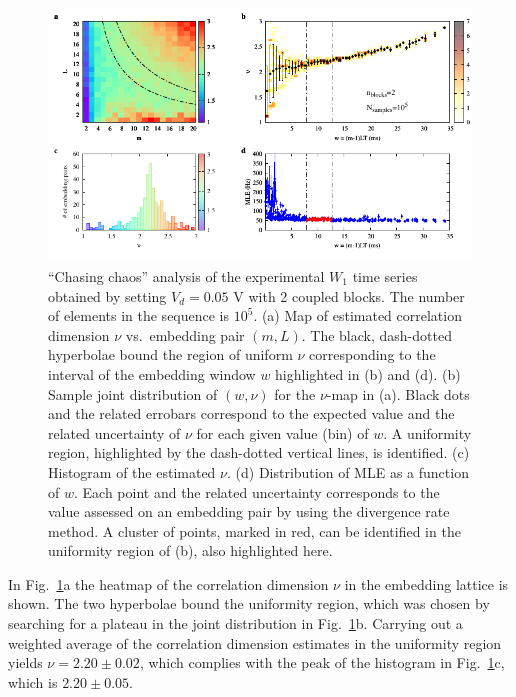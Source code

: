 \begin{figure}[ht!]
    \centering
    \includegraphics[width=\linewidth]{../blocks/2_blocks/1e5_points/plots/chaos.pdf}
    \caption{``Chasing chaos'' analysis of the experimental $W_1$ time series
    obtained by setting $V_d=0.05$ V with 2 coupled blocks.
    The number of elements in the sequence is $10^5$.
    (a) Map of estimated correlation dimension $\nu$ vs.\ embedding pair $(m, L)$.
    The black, dash-dotted hyperbolae bound the region of uniform $\nu$ corresponding to the interval of the
    embedding window $w$ highlighted in (b) and (d).
    (b) Sample joint distribution of $(w,\nu)$ for the $\nu$-map in (a).
    Black dots and the related errobars correspond to the expected value and the related uncertainty of $\nu$
    for each given value (bin) of $w$. A uniformity region, highlighted by the dash-dotted vertical lines,
    is identified. (c) Histogram of the estimated $\nu$. (d) Distribution of MLE as a function of $w$. Each point and the related
    uncertainty corresponds to the value assessed on an embedding pair by using the divergence rate method.
    A cluster of points, marked in red, can be identified in the uniformity region of (b), also highlighted here.
    }\label{fig:2 blocks chaos}
\end{figure}

In Fig.~\ref{fig:2 blocks chaos}a the heatmap of the correlation dimension $\nu$ in the embedding
lattice is shown. The two hyperbolae bound the uniformity region, which was chosen by searching for
a plateau in the joint distribution in Fig.~\ref{fig:2 blocks chaos}b.
Carrying out a weighted average of the correlation dimension estimates in the uniformity region yields
$\nu=2.20\pm0.02$, which complies with the peak of the histogram in Fig.~\ref{fig:2 blocks chaos}c,
which is $2.20\pm0.05$.

